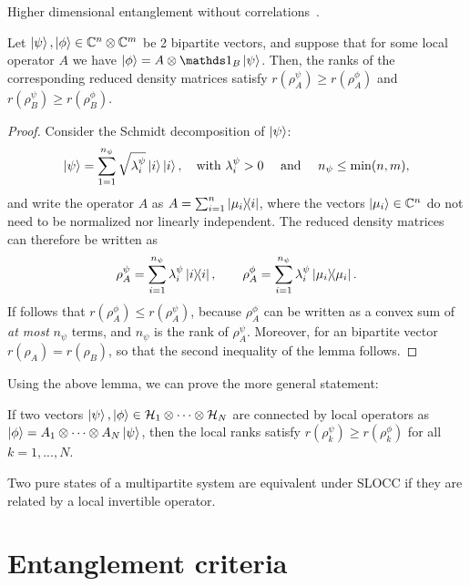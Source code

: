 \documentclass[a4paper]{report}
\newcommand{\calH}{{\mathcal{H}}}
\begin{document}
Higher dimensional entanglement without correlations~\autocite{klobus2018higher}.
\begin{lemma}
	Let $\ket\psi, \ket\phi \in \mathbb{C}^n \otimes \mathbb{C}^m$ be 2 bipartite vectors, and suppose that for some local operator $A$ we have
	$\ket\phi = A\otimes \mathds1_B \ket\psi$.
	Then, the ranks of the corresponding reduced density matrices satisfy
	$r(\rho_A^\psi) \ge r(\rho_A^\phi)$ and
	$r(\rho_B^\psi) \ge r(\rho_B^\phi)$.
\end{lemma}
\begin{proof}
	Consider the Schmidt decomposition of $\ket\psi$:
	\begin{equation}
		\ket\psi = \sum_{1=1}^{n_\psi} \sqrt{\lambda_i^\psi} \ket{i} \ket{i},
		\quad \text{with } \lambda_i^\psi > 0
		\quad\text{ and }\quad n_\psi \le \min(n,m),
	\end{equation}
	and write the operator $A$  as
	$A = \sum_{i=1}^n \ketbra{\mu_i}{i}$,
	where the vectors $\ket{\mu_i} \in \mathbb{C}^n$ do not need to be normalized nor linearly independent.
	The reduced density matrices can therefore be written as
	\begin{equation}
		\rho_A^\psi = 
		\sum_{i=1}^{n_\psi} \lambda_i^\psi \ketbra{i}{i},
		\qquad
		\rho_A^\phi = 
		\sum_{i=1}^{n_\psi} \lambda_i^\psi \ketbra{\mu_i}{\mu_i}.
	\end{equation}
	If follows that $r(\rho_A^\phi) \le r(\rho_A^\psi)$, because $\rho_A^\phi$ can be written as a convex sum of \emph{at most} $n_\psi$ terms,
	and $n_\psi$ is the rank of $\rho_A^\psi$.
	Moreover, for an bipartite vector $r(\rho_A) = r(\rho_B)$, so that the second inequality of the lemma follows.
\end{proof}
Using the above lemma, we can prove the more general statement:
\begin{lemma}
	If two vectors $\ket\psi, \ket\phi \in \calH_1 \otimes \cdots \otimes \calH_N$
	are connected by local operators as
	$\ket\phi = A_1 \otimes \cdots \otimes A_N \ket\psi$, then the local ranks satisfy
	$r(\rho^\psi_k) \ge r(\rho^\phi_k)$ for all $k=1,...,N$.
\end{lemma}
\begin{thm}
	Two pure states of a multipartite system are equivalent under \ac{SLOCC}
	if they are related by a local invertible operator.
\end{thm}

\section{Entanglement criteria}
\end{document}
